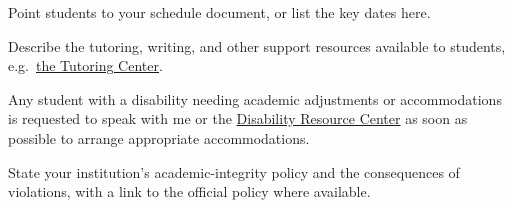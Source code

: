 \documentclass[
	course-subject  = Subject,            %
	course-number   = 000,                %
	course-title    = Course Title,       %
	short-title     = Short Title,        %
	course-section  = 0000,
	term            = Term Year,
	instructor      = Instructor Name,
	email           = you@university.edu,
	office          = Building 000,
	office-hours    = Days 0:00--0:00,
	class-time      = Days 0:00--0:00,
	course-room     = Building 000,
]{syllabus}
\begin{document}
Point students to your schedule document, or list the key dates here.


Describe the tutoring, writing, and other support resources available to
students, e.g.\ \href{https://example.edu/tutoring}{the Tutoring Center}.

Any student with a disability needing academic adjustments or accommodations is
requested to speak with me or the
\href{https://example.edu/disability}{Disability Resource Center} as soon as
possible to arrange appropriate accommodations.

State your institution's academic-integrity policy and the consequences of
violations, with a link to the official policy where available.
\end{document}

